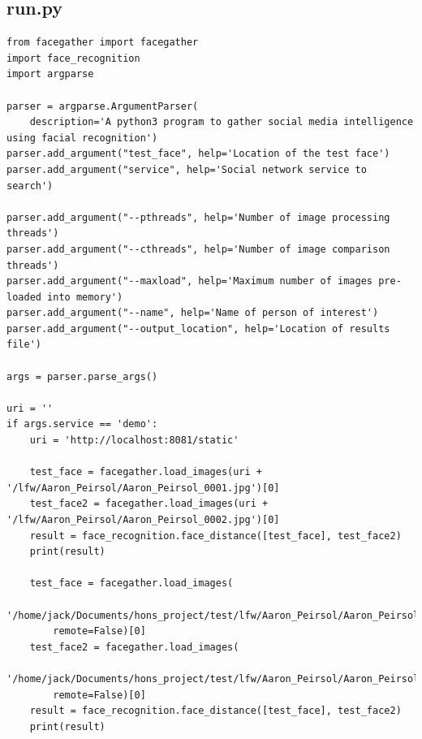 \documentclass[12pt]{article}
\begin{document}
\begin{appendices}
\begin{lstlisting}
\end{lstlisting}

\subsection{run.py}
\begin{lstlisting}
from facegather import facegather
import face_recognition
import argparse

parser = argparse.ArgumentParser(
    description='A python3 program to gather social media intelligence using facial recognition')
parser.add_argument("test_face", help='Location of the test face')
parser.add_argument("service", help='Social network service to search')

parser.add_argument("--pthreads", help='Number of image processing threads')
parser.add_argument("--cthreads", help='Number of image comparison threads')
parser.add_argument("--maxload", help='Maximum number of images pre-loaded into memory')
parser.add_argument("--name", help='Name of person of interest')
parser.add_argument("--output_location", help='Location of results file')

args = parser.parse_args()

uri = ''
if args.service == 'demo':
    uri = 'http://localhost:8081/static'

    test_face = facegather.load_images(uri + '/lfw/Aaron_Peirsol/Aaron_Peirsol_0001.jpg')[0]
    test_face2 = facegather.load_images(uri + '/lfw/Aaron_Peirsol/Aaron_Peirsol_0002.jpg')[0]
    result = face_recognition.face_distance([test_face], test_face2)
    print(result)

    test_face = facegather.load_images(
        '/home/jack/Documents/hons_project/test/lfw/Aaron_Peirsol/Aaron_Peirsol_0001.jpg',
        remote=False)[0]
    test_face2 = facegather.load_images(
        '/home/jack/Documents/hons_project/test/lfw/Aaron_Peirsol/Aaron_Peirsol_0002.jpg',
        remote=False)[0]
    result = face_recognition.face_distance([test_face], test_face2)
    print(result)


\end{lstlisting}
\end{appendices}
\end{document}
